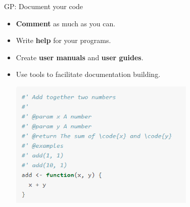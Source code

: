 \documentclass[ignorenonframetext,]{beamer}
\providecommand{\tightlist}{%
  \setlength{\itemsep}{0pt}\setlength{\parskip}{0pt}}
\begin{document}
\begin{frame}{%
\protect\hypertarget{gp-document-your-code}{%
GP: Document your code}}

\begin{itemize}
\tightlist
\item
  \textbf{Comment} as much as you can.
\item
  Write \textbf{help} for your programs.
\item
  Create \textbf{user manuals} and \textbf{user guides}.
\item
  Use tools to facilitate documentation building.

  \begin{center}
  \includegraphics[width=0.7\textwidth]{"images/roxygen"}
  \end{center}
\end{itemize}

\end{frame}
\end{document}
